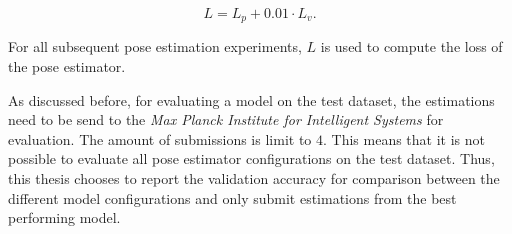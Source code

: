 \begin{equation}
    L = L_p + 0.01 \cdot L_v.
\end{equation}

For all subsequent pose estimation experiments, $L$ is used to compute the loss of the pose estimator.

As discussed before, for evaluating a model on the test dataset, the estimations need to be send to the \textit{Max Planck Institute for Intelligent Systems} for evaluation.
The amount of submissions is limit to $4$.
This means that it is not possible to evaluate all pose estimator configurations on the test dataset.
Thus, this thesis chooses to report the validation accuracy for comparison between the different model configurations and only submit estimations from the best performing model.




